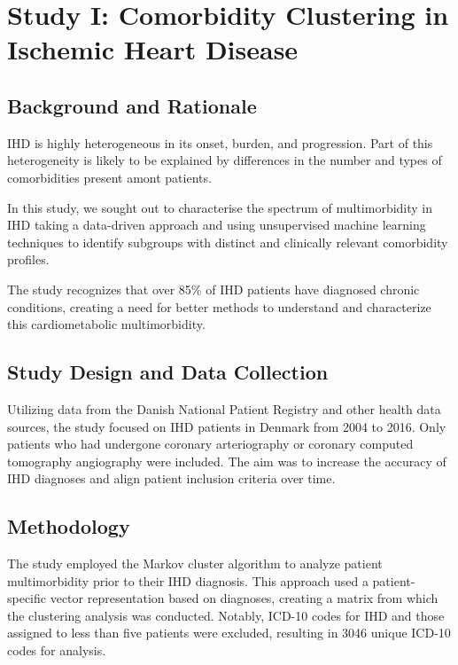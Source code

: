 \chapter{Study I: Comorbidity Clustering in Ischemic Heart Disease}
\label{outline-study-1}


\section{Background and Rationale}

\ac{IHD} is highly heterogeneous in its onset, burden, and progression.
Part of this heterogeneity is likely to be explained by differences in 
the number and types of comorbidities present amont patients.

In this study, we sought out to characterise the spectrum of multimorbidity
in \ac{IHD} taking a data-driven approach and using unsupervised
machine learning techniques to identify subgroups with distinct and clinically
relevant comorbidity profiles.

The study recognizes that over 85\% of \ac{IHD} patients have diagnosed chronic
conditions, creating a need for better methods to understand and characterize
this cardiometabolic multimorbidity.







\section{Study Design and Data Collection}

Utilizing data from the Danish National Patient Registry and other health data sources, the study focused on IHD patients in Denmark from 2004 to 2016. 
Only patients who had undergone coronary arteriography or coronary computed
tomography angiography were included. 
The aim was to increase the accuracy of IHD diagnoses and align patient
inclusion criteria over time.

\section{Methodology}

The study employed the Markov cluster algorithm to analyze patient 
multimorbidity prior to their IHD diagnosis. 
This approach used a patient-specific vector representation based on diagnoses, 
creating a matrix from which the clustering analysis was conducted. 
Notably, ICD-10 codes for IHD and those assigned to less than five patients were excluded, resulting in 3046 unique ICD-10 codes for analysis.





